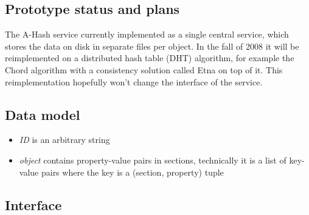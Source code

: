 \documentclass{book}
\begin{document}

\subsection{Prototype status and plans} %

The A-Hash service currently implemented as a single central service, which stores the data on disk in separate files per object. In the fall of 2008 it will be reimplemented on a distributed hash table (DHT) algorithm, for example the Chord algorithm with a consistency solution called Etna on top of it. This reimplementation hopefully won’t change the interface of the service.


\subsection{Data model} %

\begin{itemize}
    \item \emph{ID} is an arbitrary string
    \item \emph{object} contains property-value pairs in sections, technically it is a list of key-value pairs where the key is a (section, property) tuple
\end{itemize}


\subsection{Interface} %
\end{document}
